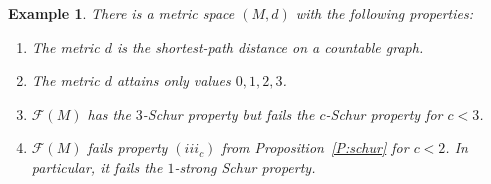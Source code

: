 \documentclass{amsart}
\numberwithin{equation}{section}
\newtheorem{example}[thm]{Example}
\theoremstyle{definition}
\def\F{\mathcal F}
\begin{document}
\begin{example}\label{ex:LF-3}
    There is a metric space $(M,d)$ with the following properties:
    \begin{enumerate}[$(a)$]
        \item The metric $d$ is the shortest-path distance on a countable graph.
        \item The metric $d$ attains only values $0,1,2,3$.
        \item $\F(M)$ has the $3$-Schur property but fails the $c$-Schur property for $c<3$.
        \item $\F(M)$ fails property $(iii_c)$ from Proposition~\ref{P:schur} for $c<2$. In particular, it fails the $1$-strong Schur property.
     \end{enumerate} 
\end{example}
\end{document}
